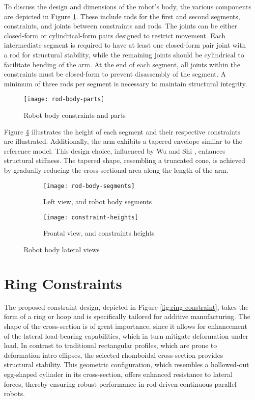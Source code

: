 To discuss the design and dimensions of the robot's body, the various components are depicted in Figure \ref{fig:bodyparts}. These include rods for the first and second segments, constraints, and joints between constraints and rods. The joints can be either closed-form or cylindrical-form pairs designed to restrict movement. Each intermediate segment is required to have at least one closed-form pair joint with a rod for structural stability, while the remaining joints should be cylindrical to facilitate bending of the arm. At the end of each segment, all joints within the constraints must be closed-form to prevent disassembly of the segment. A minimum of three rods per segment is necessary to maintain structural integrity.

\begin{figure}
    \centering
    \texttt{[image: rod-body-parts]}
    \caption{Robot body constraints and parts}
    \label{fig:bodyparts}
\end{figure}

Figure \ref{fig:robot-body-lateral} illustrates the height of each segment and their respective constraints are illustrated. Additionally, the arm exhibits a tapered envelope similar to the reference model. This design choice, influenced by Wu and Shi \cite{wu2022}, enhances structural stiffness. The tapered shape, resembling a truncated cone, is achieved by gradually reducing the cross-sectional area along the length of the arm.

\begin{figure}[H]
    \centering
    \begin{subfigure}[t]{0.2362\textwidth}
        \texttt{[image: rod-body-segments]}
        \caption{Left view, and robot body segments}
        \label{fig:segments}
    \end{subfigure}
    \begin{subfigure}[t]{0.3937\textwidth}
        \texttt{[image: constraint-heights]}
        \caption{Frontal view, and constraints heights}
        \label{fig:cons-heights}
    \end{subfigure}
    \caption{Robot body lateral views}
    \label{fig:robot-body-lateral}
\end{figure}

\section{Ring Constraints}

The proposed constraint design, depicted in Figure \ref{fig:ring-constraint}, takes the form of a ring or hoop and is specifically tailored for additive manufacturing. The shape of the cross-section is of great importance, since it allows for enhancement of the lateral load-bearing capabilities, which in turn mitigate deformation under load. In contrast to traditional rectangular profiles, which are prone to deformation intro ellipses, the selected rhomboidal cross-section provides structural stability. This geometric configuration, which resembles a hollowed-out egg-shaped cylinder in its cross-section, offers enhanced resistance to lateral forces, thereby ensuring robust performance in rod-driven continuous parallel robots.


